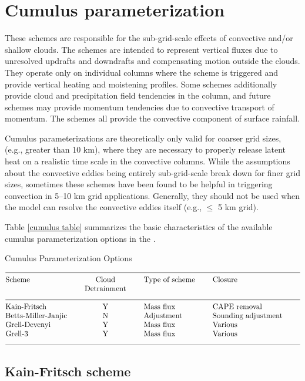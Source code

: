 \section{Cumulus parameterization}

These schemes are responsible for the sub-grid-scale effects of 
convective and/or shallow clouds. The schemes are intended to 
represent vertical fluxes due to unresolved updrafts and 
downdrafts and compensating motion outside the clouds. They 
operate only on individual columns where the scheme is triggered and 
provide vertical heating and moistening profiles. Some schemes 
additionally provide cloud and precipitation field tendencies 
in the column, and future schemes may provide momentum tendencies 
due to convective transport of momentum. The schemes all provide 
the convective component of surface rainfall.

Cumulus parameterizations are theoretically only valid for coarser grid sizes,
(e.g., greater than 10 km), where they are necessary to properly
release latent heat on a realistic time scale in the convective columns.
While the assumptions about the convective eddies being entirely
sub-grid-scale break down for finer grid sizes, sometimes these
schemes have been found to be helpful in triggering convection in
5--10 km grid applications. Generally, they should not be used when
the model can resolve the convective eddies itself (e.g., $\le$ 5 km grid).

Table \ref{cumulus table} summarizes the basic characteristics of the
available cumulus parameterization options in the {\wrf}. 
  
\begin{table}
\caption{Cumulus Parameterization Options}
\label{cumulus table}
$$\vbox
{\halign{#\hfil \qquad & \hfil#\hfil \qquad &
#\hfil \qquad & #\hfil \qquad &  #\hfil \cr
\multispan4\hrulefill \cr
Scheme   & Cloud                 &  Type of scheme    &      Closure          \cr
         & Detrainment           &                    &                \cr
\multispan4\hrulefill \cr
Kain-Fritsch         &      Y    &  Mass flux    &  CAPE removal  \cr
Betts-Miller-Janjic  &      N    &  Adjustment   &  Sounding adjustment  \cr
Grell-Devenyi        &      Y    &  Mass flux    &  Various   \cr
Grell-3              &      Y    &  Mass flux    &  Various   \cr
\multispan4\hrulefill \cr
}}$$
\end{table}

\subsection{Kain-Fritsch scheme}

